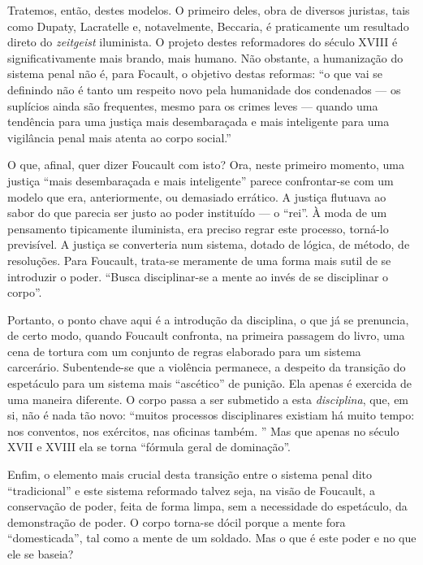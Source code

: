 \documentclass[12pt,a4paper]{article}
\begin{document}
	Tratemos, então, destes modelos. O primeiro deles, obra de diversos 
	juristas, tais como Dupaty, Lacratelle e, notavelmente, Beccaria, 
	é praticamente um resultado direto do \textit{zeitgeist} iluminista. 
	O projeto destes reformadores do século XVIII é significativamente 
	mais brando, mais humano. Não obstante, a humanização do sistema 
	penal não é, para Focault, o objetivo destas reformas:  
	``o que vai se definindo não é tanto um respeito novo pela humanidade 
	dos condenados --- os suplícios ainda são frequentes, mesmo para os 
	crimes leves --- quando uma tendência para uma justiça mais 
	desembaraçada e mais inteligente para uma vigilância penal mais atenta 
	ao corpo social.'' %

	O que, afinal, quer dizer Foucault com isto? Ora, neste primeiro 
	momento, uma justiça ``mais desembaraçada e mais inteligente'' parece 
	confrontar-se com um modelo que era, anteriormente, ou demasiado 
	errático. A justiça flutuava ao sabor do que parecia ser justo ao 
	poder instituído --- o ``rei''. À moda de um pensamento tipicamente 
	iluminista, era preciso regrar este processo, torná-lo previsível. 
	A justiça se converteria num sistema, dotado de lógica, de método, 
	de resoluções. Para Foucault, trata-se meramente de uma forma mais 
	sutil de se introduzir o poder. ``Busca disciplinar-se a mente ao 
	invés de se disciplinar o corpo''. 

	Portanto, o ponto chave aqui é a introdução da disciplina, o que já 
	se prenuncia, de certo modo, quando Foucault confronta, na primeira 
	passagem do livro, uma cena de tortura com um conjunto de regras 
	elaborado para um sistema carcerário. Subentende-se que a violência 
	permanece, a despeito da transição do espetáculo para um sistema 
	mais ``ascético'' de punição. Ela apenas é exercida de uma maneira 
	diferente. O corpo passa a ser submetido a esta \textit{disciplina}, 
	que, em si, não é nada tão novo: ``muitos processos disciplinares 
	existiam há muito tempo: nos conventos, nos exércitos, nas oficinas 
	também. '' Mas que apenas no século XVII e XVIII ela se torna 
	``fórmula geral de dominação''. %

	Enfim, o elemento mais crucial desta transição entre o sistema penal 
	dito ``tradicional'' e este sistema reformado talvez seja, na visão 
	de Foucault, a conservação de poder, feita de forma limpa, sem a 
	necessidade do espetáculo, da demonstração de poder. O corpo torna-se 
	dócil porque a mente fora ``domesticada'', tal como a mente de um 
	soldado. Mas o que é este poder e no que ele se baseia? 
\end{document}

